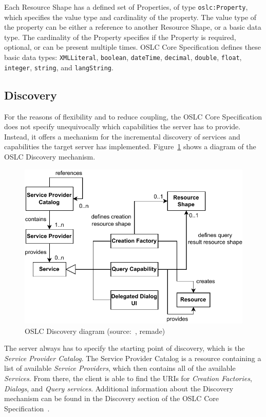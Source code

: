 Each Resource Shape has a defined set of Properties, of type \texttt{oslc:Property}, which specifies the value type and cardinality of the property. The value type of the property can be either a reference to another Resource Shape, or a basic data type. The cardinality of the Property specifies if the Property is required, optional, or can be present multiple times. OSLC Core Specification defines these basic data types: \texttt{XMLLiteral}, \texttt{boolean}, \texttt{dateTime}, \texttt{decimal}, \texttt{double}, \texttt{float}, \texttt{integer}, \texttt{string}, and \texttt{langString}.

\subsection*{Discovery}
\label{sec:oslc_discovery}
For the reasons of flexibility and to reduce coupling, the OSLC Core Specification does not specify unequivocally which capabilities the server has to provide. Instead, it offers a mechanism for the incremental discovery of services and capabilities the target server has implemented. Figure \ref{fig:oslc_discovery} shows a diagram of the OSLC Discovery mechanism.

\begin{figure}[hbt]
  \centering
  \includegraphics[width=.8 \linewidth]{figures/oslc-discovery.pdf}
  \caption{OSLC Discovery diagram (source: \cite{oslc_core_discovery}, remade)}
  \label{fig:oslc_discovery}
\end{figure}

The server always has to specify the starting point of discovery, which is the \emph{Service Provider Catalog}. The Service Provider Catalog is a resource containing a list of available \emph{Service Providers}, which then contains all of the available \emph{Services}. From there, the client is able to find the URIs for \emph{Creation Factories}, \emph{Dialogs}, and \emph{Query services}. Additional information about the Discovery mechanism can be found in the Discovery section of the OSLC Core Specification \cite{oslc_core_discovery}.


